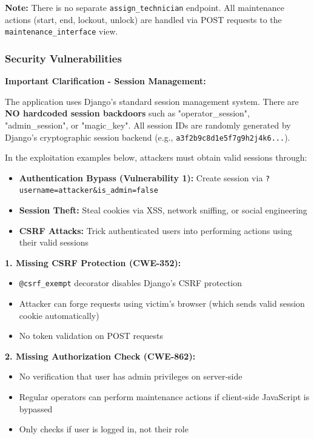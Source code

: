 \documentclass[12pt,a4paper]{article}
\begin{document}
\textbf{Note:} There is no separate \texttt{assign\_technician} endpoint. All maintenance actions (start, end, lockout, unlock) are handled via POST requests to the \texttt{maintenance\_interface} view.

\subsubsection{Security Vulnerabilities}

\textbf{Important Clarification - Session Management:}

The application uses Django's standard session management system. There are \textbf{NO hardcoded session backdoors} such as "operator\_session", "admin\_session", or "magic\_key". All session IDs are randomly generated by Django's cryptographic session backend (e.g., \texttt{a3f2b9c8d1e5f7g9h2j4k6...}).

In the exploitation examples below, attackers must obtain valid sessions through:
\begin{itemize}[leftmargin=*]
    \item \textbf{Authentication Bypass (Vulnerability 1):} Create session via \texttt{?username=attacker\&is\_admin=false}
    \item \textbf{Session Theft:} Steal cookies via XSS, network sniffing, or social engineering
    \item \textbf{CSRF Attacks:} Trick authenticated users into performing actions using their valid sessions
\end{itemize}

\textbf{1. Missing CSRF Protection (CWE-352):}
\begin{itemize}[leftmargin=*]
    \item \texttt{@csrf\_exempt} decorator disables Django's CSRF protection
    \item Attacker can forge requests using victim's browser (which sends valid session cookie automatically)
    \item No token validation on POST requests
\end{itemize}

\textbf{2. Missing Authorization Check (CWE-862):}
\begin{itemize}[leftmargin=*]
    \item No verification that user has admin privileges on server-side
    \item Regular operators can perform maintenance actions if client-side JavaScript is bypassed
    \item Only checks if user is logged in, not their role
\end{itemize}
\end{document}
